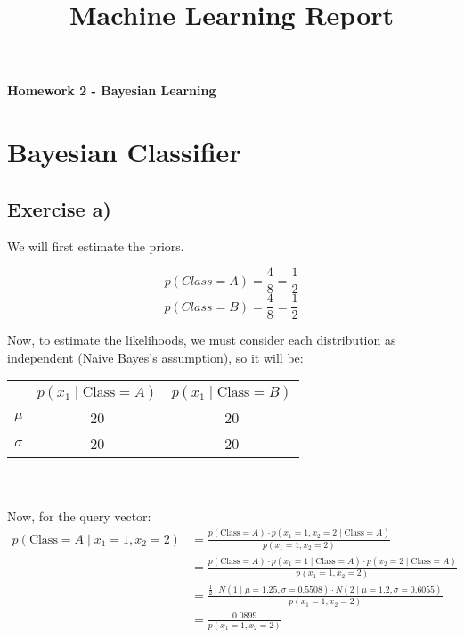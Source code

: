 \documentclass{article}
\title{Machine Learning Report}
\author{}
\date{}
\begin{document}
\maketitle
\begin{center}
    \textbf{Homework 2 - Bayesian Learning}
\end{center}

\section{Bayesian Classifier}
\subsection{Exercise a)}
We will first estimate the priors.

$$p(Class = A) = \frac{4}{8} = \frac{1}{2}$$
$$p(Class = B) = \frac{4}{8} = \frac{1}{2}$$

Now, to estimate the likelihoods, we must consider each distribution as independent (Naive Bayes's assumption), so it will be:
\\
\begin{tabular}{|c|c|c|}
    \hline
    & \( p(x_1 \mid \text{Class} = A) \) & \( p(x_1 \mid \text{Class} = B) \) \\ 
    \hline
    \( \mu \) & 20 & 20 \\
    \hline
    \( \sigma \) & 20 & 20 \\
    \hline
\end{tabular}
\\
\\
Now, for the query vector:
\begin{align*}
    p(\text{Class} = A \mid x_1 = 1, x_2 = 2) 
    &= \frac{p(\text{Class} = A) \cdot p(x_1 = 1, x_2 = 2 \mid \text{Class} = A)}{p(x_1 = 1, x_2 = 2)} \\
    &= \frac{p(\text{Class} = A) \cdot p(x_1 = 1 \mid \text{Class} = A) \cdot p(x_2 = 2 \mid \text{Class} = A)}{p(x_1 = 1, x_2 = 2)} \\
    &= \frac{\frac{1}{2} \cdot N(1 \mid \mu = 1.25, \sigma = 0.5508) \cdot N(2 \mid \mu = 1.2, \sigma = 0.6055)}{p(x_1 = 1, x_2 = 2)} \\
    &= \frac{0.0899}{p(x_1 = 1, x_2 = 2)}
\end{align*}
\end{document}
